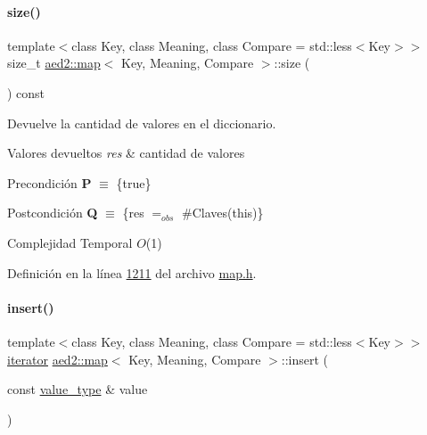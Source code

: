 \paragraph{\texorpdfstring{size()}{size()}}
{\footnotesize\ttfamily template$<$class Key, class Meaning, class Compare = std\+::less$<$\+Key$>$$>$ \\
size\+\_\+t \hyperlink{classaed2_1_1map}{aed2\+::map}$<$ Key, Meaning, Compare $>$\+::size (\begin{DoxyParamCaption}{ }\end{DoxyParamCaption}) const\hspace{0.3cm}{\ttfamily [inline]}}



Devuelve la cantidad de valores en el diccionario. 


\begin{DoxyRetVals}{Valores devueltos}
{\em res} & cantidad de valores\\
\hline
\end{DoxyRetVals}
\begin{DoxyPrecond}{Precondición}
{\bfseries P} $\equiv$ \{true\} 
\end{DoxyPrecond}
\begin{DoxyPostcond}{Postcondición}
{\bfseries Q} $\equiv$ \{res $=_{obs}$ \#Claves(this)\}
\end{DoxyPostcond}

\begin{DoxyDescription}
\item[Complejidad Temporal]$O$(1)
\end{DoxyDescription}

Definición en la línea \hyperlink{map_8h_source_l01211}{1211} del archivo \hyperlink{map_8h_source}{map.\+h}.

\mbox{\label{classaed2_1_1map_a60aacba06b1579630b3c8e996cf248c8_a60aacba06b1579630b3c8e996cf248c8}} 
\paragraph{\texorpdfstring{insert()}{insert()}\hspace{0.1cm}{\footnotesize\ttfamily [1/2]}}
{\footnotesize\ttfamily template$<$class Key, class Meaning, class Compare = std\+::less$<$\+Key$>$$>$ \\
\hyperlink{classaed2_1_1map_1_1iterator}{iterator} \hyperlink{classaed2_1_1map}{aed2\+::map}$<$ Key, Meaning, Compare $>$\+::insert (\begin{DoxyParamCaption}\item[{const \hyperlink{classaed2_1_1map_a719db98e0ff9a837610f76be33264680_a719db98e0ff9a837610f76be33264680}{value\+\_\+type} \&}]{value }\end{DoxyParamCaption})\hspace{0.3cm}{\ttfamily [inline]}}



